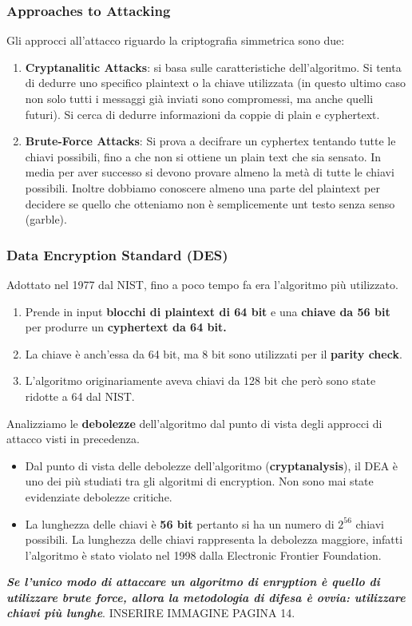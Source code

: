 \documentclass[12pt]{article}
\begin{document}
		\subsubsection{Approaches to Attacking}
			Gli approcci all'attacco riguardo la criptografia simmetrica sono due:
			\begin{enumerate}
				\item \textbf{Cryptanalitic Attacks}: si basa sulle caratteristiche dell'algoritmo. Si tenta di dedurre uno specifico plaintext o la chiave utilizzata (in questo ultimo caso non solo tutti i messaggi già inviati sono compromessi, ma anche quelli futuri). Si cerca di dedurre informazioni da coppie di plain e cyphertext.
				\item \textbf{Brute-Force Attacks}: Si prova a decifrare un cyphertex tentando tutte le chiavi possibili, fino a che non si ottiene un plain text che sia sensato. In media per aver successo si devono provare almeno la metà di tutte le chiavi possibili. Inoltre dobbiamo conoscere almeno una parte del plaintext per decidere se quello che otteniamo non è semplicemente unt testo senza senso (garble).
			\end{enumerate}
		\subsubsection{Data Encryption Standard (DES)}
			Adottato nel 1977 dal NIST, fino a poco tempo fa era l'algoritmo più utilizzato.
			\begin{enumerate}
				\item Prende in input\textbf{ blocchi di plaintext di 64 bit} e una \textbf{chiave da 56 bit} per produrre un \textbf{cyphertext da 64 bit.} 
				\item La chiave è anch'essa da 64 bit, ma 8 bit sono utilizzati per il \textbf{parity check}.
				\item L'algoritmo originariamente aveva chiavi da 128 bit che però sono state ridotte a 64 dal NIST.
			\end{enumerate}
		Analizziamo le \textbf{debolezze} dell'algoritmo dal punto di vista degli approcci di attacco visti in precedenza.
		\begin{itemize}
			\item Dal punto di vista delle debolezze dell'algoritmo (\textbf{cryptanalysis}), il DEA è uno dei più studiati tra gli algoritmi di encryption. Non sono mai state evidenziate debolezze critiche.
			\item La lunghezza delle chiavi è \textbf{56 bit} pertanto si ha un numero di $2^{56} $ chiavi possibili. La lunghezza delle chiavi rappresenta la debolezza maggiore, infatti l'algoritmo è stato violato nel 1998 dalla Electronic Frontier Foundation.
		\end{itemize}
		\textbf{\textit{Se l'unico modo di attaccare un algoritmo di enryption è quello di utilizzare brute force, allora la metodologia di difesa è ovvia: utilizzare chiavi più lunghe}}. 
		INSERIRE IMMAGINE PAGINA 14.
\end{document}
